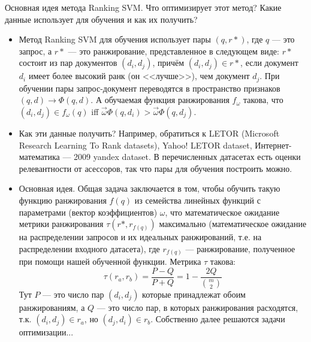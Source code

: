 \begin{task}[4]
Основная идея метода Ranking SVM. Что оптимизирует этот метод? Какие данные использует для обучения и как их получить?
\end{task}
\begin{solution}
\begin{itemize}
	\item Метод Ranking SVM для обучения использует пары $(q, r*)$, где $q$ --- это запрос, а $r*$ --- это ранжирование, представленное в следующем виде: $r*$ состоит из пар документов $(d_i, d_j)$, причём $(d_i, d_j)\in r*$, если документ $d_i$ имеет более высокий ранк (он <<лучше>>), чем документ $d_j$. При обучении пары запрос-документ переводятся в пространство признаков $(q, d) \rightarrow \Phi(q, d)$. А обучаемая функция ранжирования $f_{\omega}$ такова, что $(d_i, d_j)\in f_{\omega}(q)$ iff $\vec{\omega}\Phi(q, d_i) > \vec{\omega}\Phi(q, d_j)$.
	\item Как эти данные получить? Например, обратиться к LETOR (Microsoft Research Learning To Rank datasets), Yahoo! LETOR dataset, Интернет-математика — 2009 yandex dataset. В перечисленных датасетах есть оценки релевантности от асессоров, так что пары для обучения построить можно.
	\item Основная идея. Общая задача заключается в том, чтобы обучить такую функцию ранжирования $f(q)$ из семейства линейных функций с параметрами (вектор коэффициентов) $\omega$, что математическое ожидание метрики ранжирования $\tau(r*, r_{f(q)})$ максимально (математическое ожидание на распределении запросов и их идеальных ранжирований, т.е. на распределении входного датасета), где $r_{f(q)}$ --- ранжирование, полученное при помощи нашей обученной функции. Метрика $\tau$ такова:
	\begin{equation*}
		\tau(r_a, r_b) = \frac{P-Q}{P+Q} = 1 - \frac{2Q}{{m \choose 2}}
	\end{equation*}
	Тут $P$ --- это число пар $(d_i, d_j)$ которые принадлежат обоим ранжированиям, а $Q$ --- это число пар, в которых ранжирования расходятся, т.к. $(d_i, d_j) \in r_a$, но $(d_j, d_i) \in r_b$.
	Собственно далее решаются задачи оптимизации...
\end{itemize}
\end{solution}

